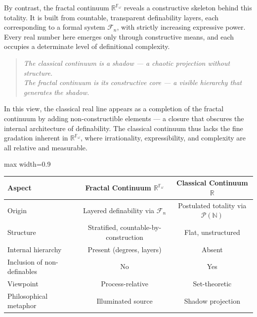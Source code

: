 \documentclass[12pt]{article}
\theoremstyle{definition}
\theoremstyle{plain}
\theoremstyle{remark}
\begin{document}
By contrast, the fractal continuum \( \mathbb{R}^{\mathbb{F}_\omega} \) reveals a constructive skeleton behind this totality. It is built from countable, transparent definability layers, each corresponding to a formal system \( \mathcal{F}_n \), with strictly increasing expressive power. Every real number here emerges only through constructive means, and each occupies a determinate level of definitional complexity.

\begin{quote}
\emph{The classical continuum is a shadow — a chaotic projection without structure.} \\
\emph{The fractal continuum is its constructive core — a visible hierarchy that generates the shadow.}
\end{quote}

In this view, the classical real line appears as a completion of the fractal continuum by adding non-constructible elements — a closure that obscures the internal architecture of definability. The classical continuum thus lacks the fine gradation inherent in \( \mathbb{R}^{\mathbb{F}_\omega} \), where irrationality, expressibility, and complexity are all relative and measurable.

\vspace{1em}

\begin{center}
\renewcommand{\arraystretch}{1.3}
\begin{adjustbox}{max width=0.9\textwidth}
\begin{tabular}{@{} lcc @{}}
\toprule
\textbf{Aspect} & \textbf{Fractal Continuum \( \mathbb{R}^{\mathbb{F}_\omega} \)} & \textbf{Classical Continuum \( \mathbb{R} \)} \\
\midrule
Origin & Layered definability via \( \mathcal{F}_n \) & Postulated totality via \( \mathcal{P}(\mathbb{N}) \) \\
Structure & Stratified, countable-by-construction & Flat, unstructured \\
Internal hierarchy & Present (degrees, layers) & Absent \\
Inclusion of non-definables & No & Yes \\
Viewpoint & Process-relative & Set-theoretic \\
Philosophical metaphor & Illuminated source & Shadow projection \\
\bottomrule
\end{tabular}
\end{adjustbox}
\end{center}
\end{document}
